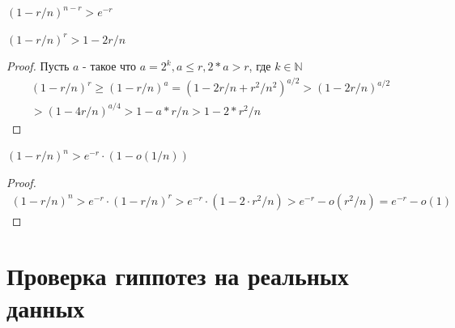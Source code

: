 \documentclass[times,specification,annotation]{itmo-student-thesis}
\begin{document}
    \begin{lemma}
        \label{exp:greater}
        $(1 - r/n)^{n - r} > e^{-r}$
    \end{lemma}

    \begin{lemma}
        \label{exp:greater2}
        $(1 - r/n)^r > 1 - 2r/n$
    \end{lemma}
    \begin{proof}
        Пусть $a$ - такое что $a = 2^k, a \leq r, 2*a > r$, где $k \in \mathbb {N}$ \\
        \begin{gather*}
            (1 - r/n)^r \geq (1 - r/n)^a = (1 - 2r/n + r^2/n^2)^{a/2} > (1 - 2r/n)^{a/2} \\
            > (1 - 4r/n)^{a/4} > 1 - a*r/n > 1 - 2*r^2/n
        \end{gather*}
    \end{proof}

    \begin{lemma}
        \label{exp:greaterO}
        $(1 - r/n)^n > e^{-r} \cdot (1 - o(1/n))$
    \end{lemma}
    \begin{proof}
        \begin{gather*}
            (1 - r/n)^n > e^{-r} \cdot (1 - r/n)^r > e^{-r} \cdot (1 - 2 \cdot r^2/n) > e^{-r} - o(r^2/n) = e^{-r} - o(1)
        \end{gather*}
    \end{proof}


    \chapter{Проверка гиппотез на реальных данных}\label{ch:проверка-гиппотез-на-реальных-данных}
\end{document}
